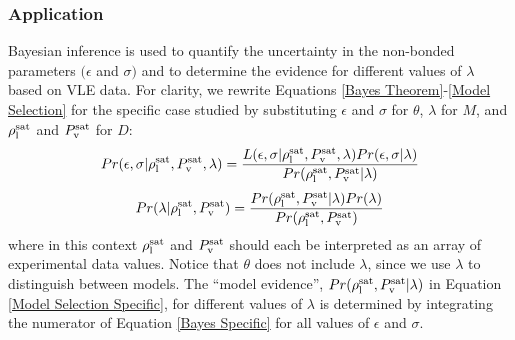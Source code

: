 \documentclass[preprint,letterpaper,floatfix,citeautoscript,aip,jcp]{revtex4-1}
\begin{document}
\subsubsection{Application}

Bayesian inference is used to quantify the uncertainty in the non-bonded parameters $(\epsilon$ and $\sigma)$ and to determine the evidence for different values of $\lambda$ based on VLE data. 
For clarity, we rewrite Equations \ref{Bayes Theorem}-\ref{Model Selection} for the specific case studied by substituting $\epsilon$ and $\sigma$ for $\theta$, $\lambda$ for $M$, and $\rho_{\rm l}^{\rm sat}$ and $P_{\rm v}^{\rm sat}$ for $D$:
\begin{equation} \label{Bayes Specific}
Pr(\epsilon,\sigma|\rho_{\rm l}^{\rm sat},P_{\rm v}^{\rm sat},\lambda) = \frac{L(\epsilon,\sigma|\rho_{\rm l}^{\rm sat},P_{\rm v}^{\rm sat},\lambda)Pr(\epsilon,\sigma|\lambda)}{Pr(\rho_{\rm l}^{\rm sat},P_{\rm v}^{\rm sat}|\lambda)}
\end{equation}
\begin{equation} \label{Model Selection Specific}
Pr(\lambda|\rho_{\rm l}^{\rm sat},P_{\rm v}^{\rm sat}) = \frac{Pr(\rho_{\rm l}^{\rm sat},P_{\rm v}^{\rm sat}|\lambda)Pr(\lambda)}{Pr(\rho_{\rm l}^{\rm sat},P_{\rm v}^{\rm sat})}
\end{equation}
where in this context $\rho_{\rm l}^{\rm sat}$ and $P_{\rm v}^{\rm sat}$ should each be interpreted as an array of experimental data values. Notice that $\theta$ does not include $\lambda$, since we use $\lambda$ to distinguish between models. The ``model evidence'', $Pr(\rho_{\rm l}^{\rm sat},P_{\rm v}^{\rm sat}|\lambda)$ in Equation \ref{Model Selection Specific}, for different values of $\lambda$ is determined by integrating the numerator of Equation \ref{Bayes Specific} for all values of $\epsilon$ and $\sigma$. 

\end{document}
